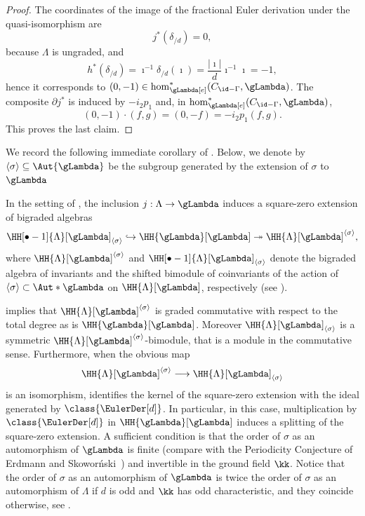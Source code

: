 \documentclass[a4paper]{amsart}
\begin{document}
\begin{proof}
  The coordinates of the image of the fractional Euler derivation under the quasi-isomorphism are
  \[j^*(\delta_{/d})=0,\]
  because \(\Lambda\) is ungraded, and
  \begin{equation*}
      h^*(\delta_{/d})=\imath^{-1}\delta_{/d}(\imath)
      =\frac{|\imath|}{d}\imath^{-1}\imath=-1,
  \end{equation*}
  hence it corresponds to \((0,-1)\in \hom^*_{\gLambda[e]}(C_{\id -\Gamma},\gLambda)\).
  The composite \(\partial j^*\) is induced by \(-i_2p_1\) and, in \(\hom^*_{\gLambda[e]}(C_{\id -\Gamma},\gLambda)\),
  \[(0,-1)\cdot(f,g)=(0,-f)=-i_2p_1(f,g).\]
  This proves the last claim.
\end{proof}

We record the following immediate corollary of . Below,
we denote by $\langle\sigma\rangle\subseteq\Aut{\gLambda}$ be the subgroup
generated by the extension of $\sigma$ to $\gLambda$

\begin{corollary}
  \label{cor:sq-zero}
  In the setting of , the inclusion
  ${j:\Lambda\to\gLambda}$ induces a square-zero extension of bigraded algebras
\[
  \HH[\bullet-1]{\Lambda}[\gLambda]_{\langle\sigma\rangle}\hookrightarrow\HH{\gLambda}[\gLambda]\twoheadrightarrow\HH{\Lambda}[\gLambda]^{\langle\sigma\rangle},
\]
where $\HH{\Lambda}[\gLambda]^{\langle\sigma\rangle}$ and
$\HH[\bullet-1]{\Lambda}[\gLambda]_{\langle\sigma\rangle}$ denote the bigraded algebra of
invariants and the shifted bimodule of coinvariants of the action of
${\langle\sigma\rangle\subset\Aut*{\gLambda}}$ on $\HH{\Lambda}[\gLambda]$,
respectively (see ).
\end{corollary}

\begin{remark}
   implies that $\HH{\Lambda}[\gLambda]^{\langle\sigma\rangle}$ is graded
  commutative with respect to the total degree as is
  $\HH{\gLambda}[\gLambda]$. Moreover
  $\HH{\Lambda}[\gLambda]_{\langle\sigma\rangle}$ is a symmetric
  $\HH{\Lambda}[\gLambda]^{\langle\sigma\rangle}$-bimodule, that is a module in
  the commutative sense. Furthermore, when the obvious map
  \[
    \HH{\Lambda}[\gLambda]^{\langle\sigma\rangle}\longrightarrow\HH{\Lambda}[\gLambda]_{\langle\sigma\rangle}
  \]
  is an isomorphism,  identifies the kernel of the
  square-zero extension with the ideal generated by $\class{\EulerDer[d]}$. In
  particular, in this case, multiplication by $\class{\EulerDer[d]}$ in
  $\HH{\gLambda}[\gLambda]$ induces a splitting of the square-zero extension. A
  sufficient condition is that the order of $\sigma$ as an automorphism of
  $\gLambda$ is finite (compare with the Periodicity
  Conjecture of Erdmann and Skowor{\'n}ski~\cite{ES08}) and invertible in the ground field $\kk$. Notice that the
  order of $\sigma$ as an automorphism of $\gLambda$ is twice the order of
  $\sigma$ as an automorphism of $\Lambda$ if $d$ is odd and $\kk$ has odd
  characteristic, and they coincide otherwise, see .
\end{remark}
\end{document}
